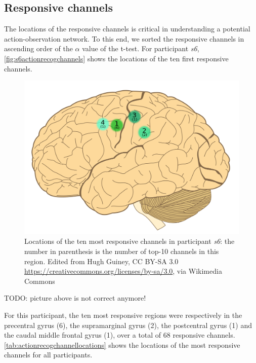 \documentclass[10pt,conference,compsocconf]{IEEEtran}
\begin{document}
\subsection{Responsive channels}
The locations of the responsive channels is critical in understanding a potential action-observation network. To this end, we sorted the responsive channels in ascending order of the \(\alpha\) value of the t-test. For participant \textit{s6}, \autoref{fig:s6actionrecogchannels} shows the locations of the ten first responsive channels.

\begin{figure}[h!]
    \center
    \includegraphics[width=0.8\linewidth]{images/2560px-Human-brain.SVG.png}
    \caption{Locations of the ten most responsive channels in participant \textit{s6}: the number in parenthesis is the number of top-10 channels in this region. Edited from Hugh Guiney, CC BY-SA 3.0 \url{https://creativecommons.org/licenses/by-sa/3.0}, via Wikimedia Commons}
    \label{fig:s6actionrecogchannels}
\end{figure}
\FloatBarrier
TODO: picture above is not correct anymore!

For this participant, the ten most responsive regions were respectively in the precentral gyrus (6), the supramarginal gyrus (2), the postcentral gyrus (1) and the caudal middle frontal gyrus (1), over a total of 68 responsive channels. \autoref{tab:actionrecogchannellocations} shows the locations of the most responsive channels for all participants.
\end{document}
